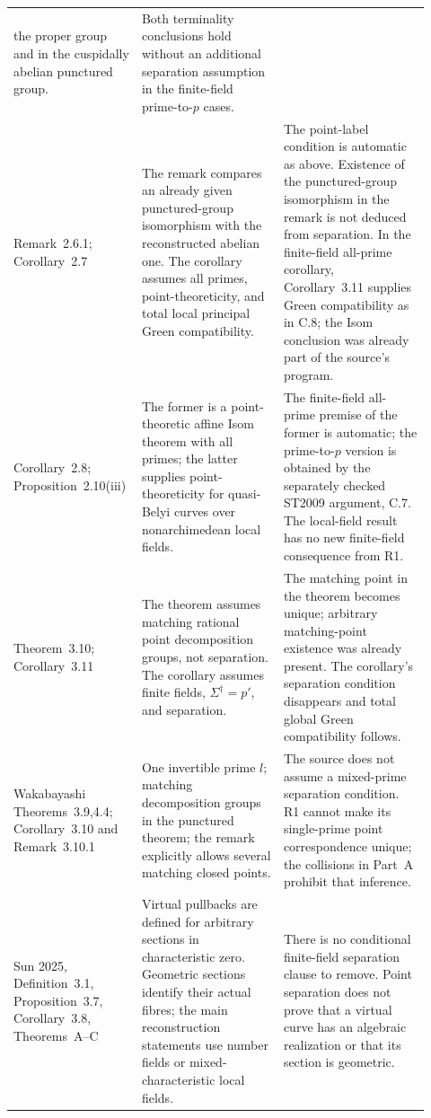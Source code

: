 \documentclass[11pt,a4paper]{article}
\begin{document}
\begin{center}
\begin{longtable}{p{0.25\linewidth}p{0.33\linewidth}p{0.34\linewidth}}
the proper group and in the cuspidally abelian punctured group.&
Both terminality conclusions hold without an additional
separation assumption in the finite-field prime-to-$p$ cases.\\
Remark~2.6.1; Corollary~2.7&
The remark compares an already given punctured-group
isomorphism with the reconstructed abelian one. The corollary
assumes all primes, point-theoreticity, and total local principal
Green compatibility.&
The point-label condition is automatic as above. Existence of
the punctured-group isomorphism in the remark is not deduced
from separation. In the finite-field all-prime corollary,
Corollary~3.11 supplies Green compatibility as in C.8;
the Isom conclusion was already part of the source's program.\\
Corollary~2.8; Proposition~2.10(iii)&
The former is a point-theoretic affine Isom theorem with all
primes; the latter supplies point-theoreticity for quasi-Belyi
curves over nonarchimedean local fields.&
The finite-field all-prime premise of the former is automatic;
the prime-to-$p$ version is obtained by the separately checked
ST2009 argument, C.7. The local-field result has no new
finite-field consequence from R1.\\
Theorem~3.10; Corollary~3.11&
The theorem assumes matching rational point decomposition
groups, not separation. The corollary assumes finite fields,
$\Sigma^\dagger=p'$, and separation.&
The matching point in the theorem becomes unique; arbitrary
matching-point existence was already present. The corollary's
separation condition disappears and total global Green
compatibility follows.\\
Wakabayashi Theorems~3.9,4.4; Corollary~3.10 and
Remark~3.10.1&
One invertible prime $l$; matching decomposition groups in the
punctured theorem; the remark explicitly allows several
matching closed points.&
The source does not assume a mixed-prime separation condition.
R1 cannot make its single-prime point correspondence unique;
the collisions in Part~A prohibit that inference.\\
Sun 2025, Definition~3.1, Proposition~3.7, Corollary~3.8,
Theorems~A--C&
Virtual pullbacks are defined for arbitrary sections in
characteristic zero. Geometric sections identify their actual
fibres; the main reconstruction statements use number fields
or mixed-characteristic local fields.&
There is no conditional finite-field separation clause to
remove. Point separation does not prove that a virtual curve
has an algebraic realization or that its section is geometric.\\

\end{longtable}
\end{center}
\end{document}
